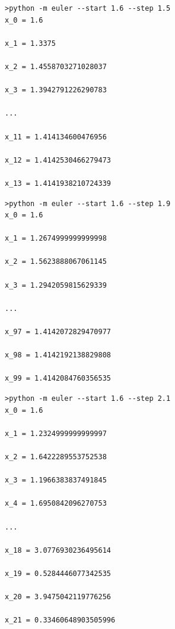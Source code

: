 \documentclass[nonumber]{homework}
\begin{document}
	\begin{minipage}{\linewidth}
	\begin{lstlisting}[basicstyle=\small\ttfamily, frame=single, caption={Console command and output, $h=1.5$ (abridged)}, label=lst:step1.5]
>python -m euler --start 1.6 --step 1.5
x_0 = 1.6

x_1 = 1.3375

x_2 = 1.4558703271028037

x_3 = 1.3942791226290783

...

x_11 = 1.414134600476956

x_12 = 1.4142530466279473

x_13 = 1.4141938210724339
	\end{lstlisting}
	\end{minipage}
	
	\begin{lstlisting}[basicstyle=\small\ttfamily, frame=single, caption={Console command and output, $h=1.9$ (abridged)}, label=lst:step1.9]
>python -m euler --start 1.6 --step 1.9
x_0 = 1.6

x_1 = 1.2674999999999998

x_2 = 1.5623888067061145

x_3 = 1.2942059815629339

...

x_97 = 1.4142072829470977

x_98 = 1.4142192138829808

x_99 = 1.4142084760356535	
	\end{lstlisting}
	
	\begin{minipage}{\linewidth}
	\begin{lstlisting}[basicstyle=\small\ttfamily, frame=single, caption={Console command and output, $h=2.1$ (abridged)}, label=lst:step2.1]
>python -m euler --start 1.6 --step 2.1
x_0 = 1.6

x_1 = 1.2324999999999997

x_2 = 1.6422289553752538

x_3 = 1.1966383837491845

x_4 = 1.6950842096270753

...

x_18 = 3.0776930236495614

x_19 = 0.5284446077342535

x_20 = 3.9475042119776256

x_21 = 0.33460648903505996
	\end{lstlisting}
	\end{minipage}
	
\end{document}
